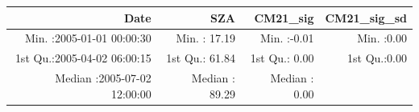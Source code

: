 \documentclass[
  10pt,
  a4paper,oneside]{article}
\begin{document}
\begin{longtable}[]{@{}rrrr@{}}
\toprule
\begin{minipage}[b]{0.34\columnwidth}\raggedleft
Date\strut
\end{minipage} & \begin{minipage}[b]{0.19\columnwidth}\raggedleft
SZA\strut
\end{minipage} & \begin{minipage}[b]{0.18\columnwidth}\raggedleft
CM21\_sig\strut
\end{minipage} & \begin{minipage}[b]{0.18\columnwidth}\raggedleft
CM21\_sig\_sd\strut
\end{minipage}\tabularnewline
\midrule
\endhead
\begin{minipage}[t]{0.34\columnwidth}\raggedleft
Min. :2005-01-01 00:00:30\strut
\end{minipage} & \begin{minipage}[t]{0.19\columnwidth}\raggedleft
Min. : 17.19\strut
\end{minipage} & \begin{minipage}[t]{0.18\columnwidth}\raggedleft
Min. :-0.01\strut
\end{minipage} & \begin{minipage}[t]{0.18\columnwidth}\raggedleft
Min. :0.00\strut
\end{minipage}\tabularnewline
\begin{minipage}[t]{0.34\columnwidth}\raggedleft
1st Qu.:2005-04-02 06:00:15\strut
\end{minipage} & \begin{minipage}[t]{0.19\columnwidth}\raggedleft
1st Qu.: 61.84\strut
\end{minipage} & \begin{minipage}[t]{0.18\columnwidth}\raggedleft
1st Qu.: 0.00\strut
\end{minipage} & \begin{minipage}[t]{0.18\columnwidth}\raggedleft
1st Qu.:0.00\strut
\end{minipage}\tabularnewline
\begin{minipage}[t]{0.34\columnwidth}\raggedleft
Median :2005-07-02 12:00:00\strut
\end{minipage} & \begin{minipage}[t]{0.19\columnwidth}\raggedleft
Median : 89.29\strut
\end{minipage} & \begin{minipage}[t]{0.18\columnwidth}\raggedleft
Median : 0.00\strut
\end{minipage} & \begin{minipage}[t]{0.18\columnwidth}\raggedleft

\end{minipage}
\end{longtable}
\end{document}
